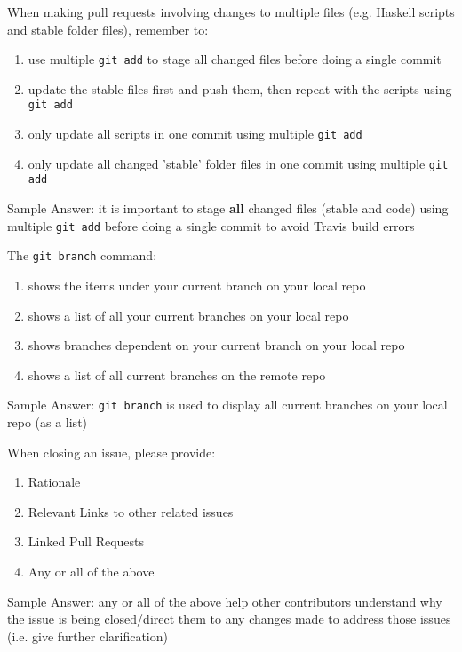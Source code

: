 \documentclass[12pt,fleqn]{examtst}
\begin{document}

\newpage
\noindent
\begin{minipage}{\textwidth}

When making pull requests involving changes to multiple files (e.g. Haskell scripts and stable folder files), remember to:

\begin{enumerate}
    \item use multiple \lstinline{git add} to stage all changed files before doing a single commit \marker
    \item update the stable files first and push them, then repeat with the scripts using \lstinline{git add}
    \item only update all scripts in one commit using multiple \lstinline{git add}
    \item only update all changed 'stable' folder files in one commit using multiple \lstinline{git add}
\end{enumerate}
Sample Answer: it is important to stage \textbf{all} changed files (stable and code) using multiple \lstinline{git add} before doing a single commit to avoid Travis build errors

The \lstinline{git branch} command:

\begin{enumerate}
    \item shows the items under your current branch on your local repo
    \item shows a list of all your current branches on your local repo \marker
    \item shows branches dependent on your current branch on your local repo
    \item shows a list of all current branches on the remote repo
\end{enumerate}
Sample Answer: \lstinline{git branch} is used to display all current branches on your local repo (as a list)

When closing an issue, please provide:

\begin{enumerate}
    \item Rationale
    \item Relevant Links to other related issues
    \item Linked Pull Requests
    \item Any or all of the above \marker
\end{enumerate}
Sample Answer: any or all of the above help other contributors understand why the issue is being closed/direct them to any changes made to address those issues (i.e. give further clarification)

\end{minipage}
\end{document}
